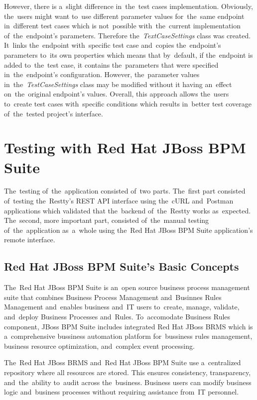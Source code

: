 However, there is a~slight difference in~the~test cases implementation. Obviously, the~users might want to~use different parameter values for~the~same
endpoint in~different test cases which is not~possible with~the~current implementation of~the~endpoint's parameters. Therefore the~\textit{TextCaseSettings}
class was created. It~links the~endpoint with~specific test case and~copies the~endpoint's parameters to~its own properties which means that by~default,
if the~endpoint is added to~the~test case, it contains the~parameters that were specified in~the~endpoint's configuration. However, the~parameter values
in~the~\textit{TestCaseSettings} class may be modified without it having an~effect on~the~original endpoint's values. Overall, this approach allows the~users
to~create test cases with~specific conditions which results in~better test coverage of~the~tested project's interface.


\section{Testing with Red Hat JBoss BPM Suite}
\label{Testing}
The~testing of~the~application consisted of~two parts. The~first part consisted of~testing the~Restty's REST API
interface using the~cURL and~Postman applications which validated that the~backend of~the~Restty works as~expected.
The~second, more important part, consisted of~the~manual testing of~the~application as~a~whole using the~Red Hat JBoss BPM
Suite application's remote interface.

\subsection{Red Hat JBoss BPM Suite's Basic Concepts}
The~Red Hat JBoss BPM Suite is an~open source business process management suite that combines Business Process Management
and~Businnes Rules Management and~enables business and~IT users to~create, manage, validate, and~deploy Business Processes
and~Rules. To~accomodate Business Rules component, JBoss BPM Suite includes integrated Red Hat JBoss BRMS which is a~comprehensive
bussiness automation platform for~bussiness rules management, business resource optimization, and~complex event processing.

The~Red Hat JBoss BRMS and~Red Hat JBoss BPM Suite use a~centralized repository where all resources are stored. This ensures
consistency, transparency, and~the~ability to~audit across the~business. Business users can modify business logic and~business processes
without requiring assistance from~IT personnel.

